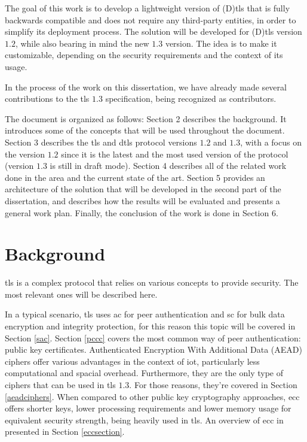 \documentclass{llncs}
\begin{document}
The goal of this work is to develop a lightweight version of (D)\gls{tls} that is
fully backwards compatible and does not require any third-party entities, in order
to simplify its deployment process. The solution will be developed for
(D)\gls{tls} version $1.2$, while also bearing in mind the new $1.3$ version. The idea is to make it customizable,
depending on the security requirements and the context of its usage.

In the process of the work on this dissertation, we have already made several
contributions to the \gls{tls} $1.3$ specification, being recognized as contributors\cite{Mergepul65:online}.

The document is organized as follows: Section 2 describes the background. It
introduces some of the concepts that will be used throughout
the document. Section 3 describes the \gls{tls} and \gls{dtls} protocol
versions $1.2$ and $1.3$, with a focus on the version $1.2$ since
it is the latest and the most used version of the protocol (version $1.3$ is still in
draft mode). Section 4 describes all of the related work done in the area and
the current state of the art. Section 5 provides an architecture of the
solution that will be developed in the second part of the dissertation,
and describes how the results will be evaluated and presents a general work plan. Finally, the conclusion of the work is done in Section 6.

\section{Background}

\gls{tls} is a complex protocol that relies on various concepts to provide
security. The most relevant ones will be described here.

In a typical scenario, \gls{tls} uses \gls{ac} for peer authentication and \gls{sc} for bulk data
encryption and integrity protection, for this reason this topic will be covered in Section \ref{sac}. Section \ref{pccc} covers the most common way of peer authentication: public key certificates. Authenticated Encryption With Additional Data (AEAD) ciphers offer various advantages in the
context of \gls{iot}, particularly less computational and spacial overhead.
Furthermore, they are the only type of ciphers that can be used in \gls{tls}
$1.3$. For those reasons, they're covered in Section \ref{aeadciphers}.
When compared to other public key cryptography approaches, \gls{ecc} offers shorter keys, lower processing requirements and lower memory usage for equivalent security strength, being heavily used
in \gls{tls}. An overview of \gls{ecc} in presented in Section \ref{eccsection}.
\end{document}
